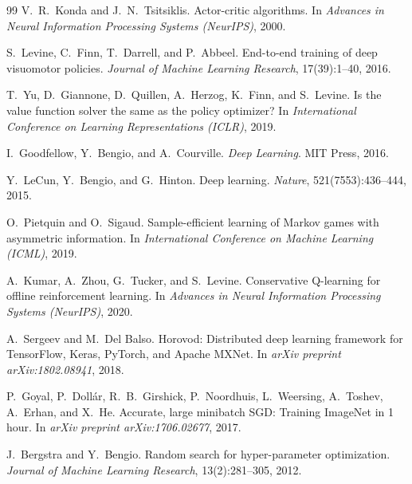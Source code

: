 \documentclass[12pt,a4paper,openany]{report}
\begin{document}
\begin{thebibliography}{99}
 V.~R.~Konda and J.~N.~Tsitsiklis. Actor-critic algorithms. In \textit{Advances in Neural Information Processing Systems (NeurIPS)}, 2000.


 S.~Levine, C.~Finn, T.~Darrell, and P.~Abbeel. End-to-end training of deep visuomotor policies. \textit{Journal of Machine Learning Research}, 17(39):1--40, 2016.

 T.~Yu, D.~Giannone, D.~Quillen, A.~Herzog, K.~Finn, and S.~Levine. Is the value function solver the same as the policy optimizer? In \textit{International Conference on Learning Representations (ICLR)}, 2019.


 I.~Goodfellow, Y.~Bengio, and A.~Courville. \textit{Deep Learning}. MIT Press, 2016.

 Y.~LeCun, Y.~Bengio, and G.~Hinton. Deep learning. \textit{Nature}, 521(7553):436--444, 2015.


 O.~Pietquin and O.~Sigaud. Sample-efficient learning of Markov games with asymmetric information. In \textit{International Conference on Machine Learning (ICML)}, 2019.

 A.~Kumar, A.~Zhou, G.~Tucker, and S.~Levine. Conservative Q-learning for offline reinforcement learning. In \textit{Advances in Neural Information Processing Systems (NeurIPS)}, 2020.


 A.~Sergeev and M.~Del Balso. Horovod: Distributed deep learning framework for TensorFlow, Keras, PyTorch, and Apache MXNet. In \textit{arXiv preprint arXiv:1802.08941}, 2018.

 P.~Goyal, P.~Dollár, R.~B.~Girshick, P.~Noordhuis, L.~Weersing, A.~Toshev, A.~Erhan, and X.~He. Accurate, large minibatch SGD: Training ImageNet in 1 hour. In \textit{arXiv preprint arXiv:1706.02677}, 2017.


 J.~Bergstra and Y.~Bengio. Random search for hyper-parameter optimization. \textit{Journal of Machine Learning Research}, 13(2):281--305, 2012.


\end{thebibliography}
\end{document}
